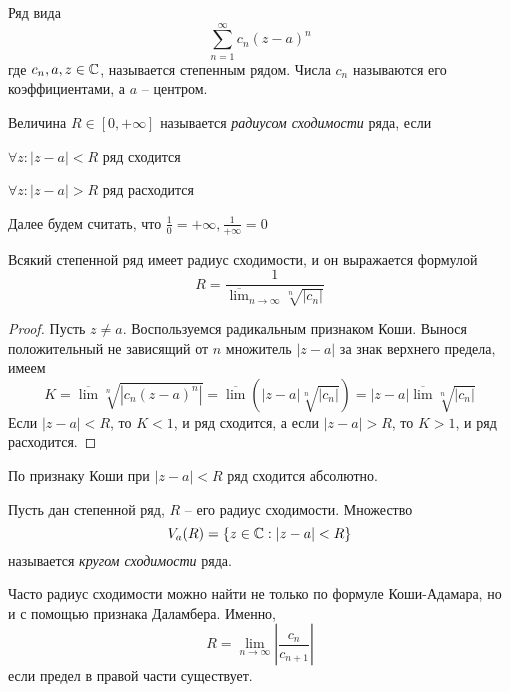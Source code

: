 
\begin{Def}
	Ряд вида 
	\[\sum_{n=1}^{\infty} c_n(z - a)^n\]
	где $c_n, a, z \in \mathbb{C}$, называется степенным рядом. Числа $c_n$ называются его коэффициентами, а $a$ -- центром. 
\end{Def}

\begin{Def}
	Величина $R \in [0, +\infty]$ называется \textit{радиусом сходимости} ряда, если
	\begin{MyList}
		\item $\forall z : |z - a| < R$ ряд сходится
		\item $\forall z : |z - a| > R$ ряд расходится 
	\end{MyList} 
\end{Def}

\begin{Rem}
	Далее будем считать, что $\frac{1}{0} = +\infty, \frac{1}{+\infty} = 0$ 
\end{Rem}

\begin{Thm}
	Всякий степенной ряд имеет радиус сходимости, и он выражается формулой
	\[R = \frac{1}{\displaystyle{\overline{\lim}_{n \to \infty} \sqrt[n]{|c_n|}}}\]
\end{Thm}

\begin{proof}
	Пусть $z \neq a$. Воспользуемся радикальным признаком Коши. Вынося положительный не зависящий от $n$ множитель $|z - a|$ за знак верхнего предела, имеем
	\[K = \overline{\lim} \sqrt[n]{|c_n(z - a)^n|} = \overline{\lim} \left(|z - a| \sqrt[n]{|c_n|}\right) = |z - a| \overline{\lim} \sqrt[n]{|c_n|}\] 
	Если $|z - a| < R$, то $K < 1$, и ряд сходится, а если $|z - a| > R$, то $K > 1$, и ряд расходится.
\end{proof}

\begin{Rem}
	По признаку Коши при $|z - a| < R$ ряд сходится абсолютно.
\end{Rem}

\begin{Def}
	Пусть дан степенной ряд, $R$ -- его радиус сходимости. Множество
	\[V_a(R) = \{z \in \mathbb{C} : |z - a| < R\}\]
	называется \textit{кругом сходимости} ряда. 
\end{Def}

\begin{Rem}
	Часто радиус сходимости можно найти не только по формуле Коши-Адамара, но и с помощью признака Даламбера. Именно,
	\[R = \lim_{n \to \infty} \left| \frac{c_n}{c_{n + 1}}\right|\]
	если предел в правой части существует.
\end{Rem}

